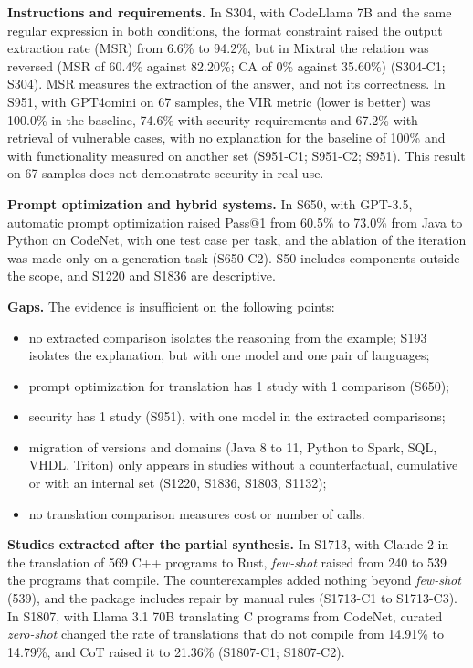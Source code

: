 \textbf{Instructions and requirements.}
In S304, with CodeLlama 7B and the same regular expression in both conditions, the format constraint raised the output extraction rate (MSR) from 6.6\% to 94.2\%, but in Mixtral the relation was reversed (MSR of 60.4\% against 82.20\%; CA of 0\% against 35.60\%) (S304-C1; S304).
MSR measures the extraction of the answer, and not its correctness.
In S951, with GPT4omini on 67 samples, the VIR metric (lower is better) was 100.0\% in the baseline, 74.6\% with security requirements and 67.2\% with retrieval of vulnerable cases, with no explanation for the baseline of 100\% and with functionality measured on another set (S951-C1; S951-C2; S951).
This result on 67 samples does not demonstrate security in real use.

\textbf{Prompt optimization and hybrid systems.}
In S650, with GPT-3.5, automatic prompt optimization raised Pass@1 from 60.5\% to 73.0\% from Java to Python on CodeNet, with one test case per task, and the ablation of the iteration was made only on a generation task (S650-C2).
S50 includes components outside the scope, and S1220 and S1836 are descriptive.

\textbf{Gaps.} The evidence is insufficient on the following points:
\begin{itemize}
  \item no extracted comparison isolates the reasoning from the example; S193 isolates the explanation, but with one model and one pair of languages;
  \item prompt optimization for translation has 1 study with 1 comparison (S650);
  \item security has 1 study (S951), with one model in the extracted comparisons;
  \item migration of versions and domains (Java 8 to 11, Python to Spark, SQL, VHDL, Triton) only appears in studies without a counterfactual, cumulative or with an internal set (S1220, S1836, S1803, S1132);
  \item no translation comparison measures cost or number of calls.
\end{itemize}

\textbf{Studies extracted after the partial synthesis.}
In S1713, with Claude-2 in the translation of 569 C++ programs to Rust, \textit{few-shot} raised from 240 to 539 the
programs that compile. The counterexamples added nothing beyond \textit{few-shot} (539), and the package includes
repair by manual rules (S1713-C1 to S1713-C3).
In S1807, with Llama 3.1 70B translating C programs from CodeNet, curated \textit{zero-shot} changed the rate of
translations that do not compile from 14.91\% to 14.79\%, and CoT raised it to 21.36\% (S1807-C1; S1807-C2).

